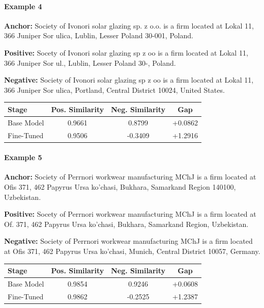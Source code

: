 \documentclass{article}
\begin{document}
\paragraph{Example 4}

\textbf{Anchor:} Society of Ivonori solar glazing sp. z o.o. is a firm located at Lokal 11, 366 Juniper Sor ulica, Lublin, Lesser Poland 30-001, Poland.

\textbf{Positive:} Socety of Ivonori solar glazing sp z oo is a firm located at Lokal 11, 366 Juniper Sor ul., Lublin, Lesser Poland 30-, Poland.

\textbf{Negative:} Society of Ivonori solar glazing sp z oo is a firm located at Lokal 11, 366 Juniper Sor ulica, Portland, Central District 10024, United States.

\begin{center}
\small
\begin{tabular}{lccc}
\toprule
Stage & Pos. Similarity & Neg. Similarity & Gap \\
\midrule
Base Model & 0.9661 & 0.8799 & +0.0862 \\
Fine-Tuned & 0.9506 & -0.3409 & +1.2916 \\
\bottomrule
\end{tabular}
\end{center}

\paragraph{Example 5}

\textbf{Anchor:} Society of Perrnori workwear manufacturing MChJ is a firm located at Ofis 371, 462 Papyrus Ursa ko'chasi, Bukhara, Samarkand Region 140100, Uzbekistan.

\textbf{Positive:} Socety of Perrnori workwear manufacturing MChJ is a firm located at Of. 371, 462 Papyrus Ursa ko'chasi, Bukhara, Samarkand Region, Uzbekistan.

\textbf{Negative:} Society of Perrnori workwear manufacturing MChJ is a firm located at Ofis 371, 462 Papyrus Ursa ko'chasi, Munich, Central District 10057, Germany.

\begin{center}
\small
\begin{tabular}{lccc}
\toprule
Stage & Pos. Similarity & Neg. Similarity & Gap \\
\midrule
Base Model & 0.9854 & 0.9246 & +0.0608 \\
Fine-Tuned & 0.9862 & -0.2525 & +1.2387 \\
\bottomrule
\end{tabular}
\end{center}
\end{document}
